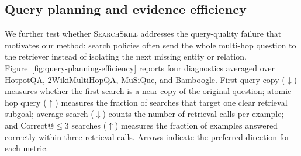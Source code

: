 \documentclass{article}
\newcommand{\Ours}{\textsc{SearchSkill}\xspace}
\begin{document}
\subsection{Query planning and evidence efficiency}
\label{sec:further-analysis-query-efficiency}

We further test whether \Ours addresses the query-quality failure that motivates our method: search policies often send the whole multi-hop question to the retriever instead of isolating the next missing entity or relation. Figure~\ref{fig:query-planning-efficiency} reports four diagnostics averaged over HotpotQA, 2WikiMultiHopQA, MuSiQue, and Bamboogle. First query copy (\(\downarrow\)) measures whether the first search is a near copy of the original question; atomic-hop query (\(\uparrow\)) measures the fraction of searches that target one clear retrieval subgoal; average search (\(\downarrow\)) counts the number of retrieval calls per example; and Correct@\( \le 3 \) searches (\(\uparrow\)) measures the fraction of examples answered correctly within three retrieval calls. Arrows indicate the preferred direction for each metric.
\end{document}
